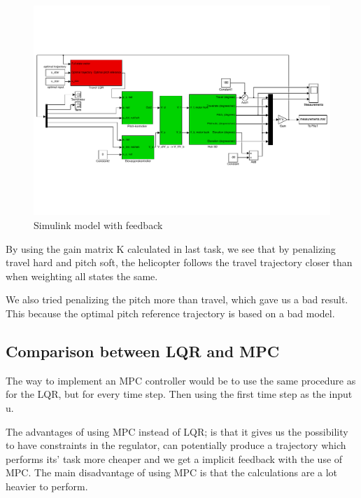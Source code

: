 \begin{figure}[htb]
	\centering
	\includegraphics[width = \textwidth]{figures/day3_mdl}
	\caption{Simulink model with feedback}
	\label{fig:day3_mdl}
\end{figure}

By using the gain matrix K calculated in last task, we see that by penalizing travel hard and pitch soft, the helicopter follows the travel trajectory closer than when weighting all states the same.

We also tried penalizing the pitch more than travel, which gave us a bad result. This because the optimal pitch reference trajectory is based on a bad model. 

\subsection{Comparison between LQR and MPC}
The way to implement an MPC controller would be to use the same procedure as for the LQR, but for every time step. Then using the first time step as the input u.

The advantages of using MPC instead of LQR; is that it gives us the possibility to have constraints in the regulator, can potentially produce a trajectory which performs its' task more cheaper and we get a implicit feedback with the use of MPC.
The main disadvantage of using MPC is that the calculations are a lot heavier to perform.
